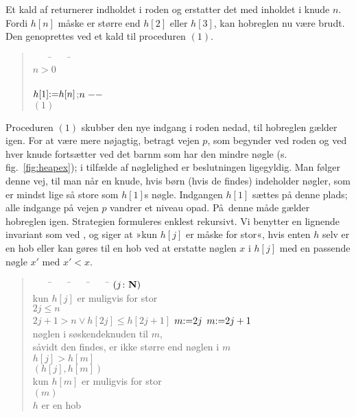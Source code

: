 Et kald af  returnerer indholdet i roden og erstatter det med inholdet i knude $n$.
Fordi $h[n]$ måske er større end $h[2]$ eller $h[3]$, kan hobreglen nu være brudt.
Den genoprettes ved et kald til proceduren $(1)$.

\begin{quote}
\begin{tabbing}
~~~~\=~~~~\=\kill
\Function {}\+\\
\Assert $n>0$\\
\\
$h[1]{\ensuremath{\mathbin{:=}}} h[n]$;\quad $n\mathrel{{-}{-}}$\\
$(1)$\\
\Return {}
\end{tabbing}
\end{quote}

Proceduren $(1)$ skubber den nye indgang i roden nedad, til hobreglen gælder igen.
For at være mere nøjagtig, betragt vejen $p$, som begynder ved roden og ved hver knude fortsætter ved det barnm som har den mindre nøgle (s. fig.~\ref{fig:heapex});
i tilfælde af nøglelighed er beslutningen ligegyldig. 
Man følger denne vej, til man når en knude, hvis børn (hvis de findes) indeholder nøgler, som er mindst lige så store som $h[1]$s nøgle.
Indgangen $h[1]$ sættes på denne plads; alle indgange på vejen $p$ vandrer et niveau opad.
På denne måde gælder hobreglen igen.
Strategien formuleres enklest rekursivt.
Vi benytter en lignende invariant som ved , og siger at »kun $h[j]$ er måske for stor«, hvis enten $h$ selv er en hob eller kan gøres til en hob ved at erstatte nøglen $x$ i  $h[j]$ med en passende nøgle $x'$ med  $x' < x$. 

\begin{quote}
\begin{tabbing}
~~~~\=~~~~\=~~~~\=~~~~\=\kill
\Procedure{}$(j{\colon} \mathbf N)$\+\\
\Assert kun $h[j]$ er muligvis for stor \\
\If $2j \leq n$ \Then\+\\
  \If $2j + 1 > n \vee h[2j] \le h[2j + 1]$ \Then $m {\mathbin{:=}} 2j$ \Else $m{\mathbin{:=}} 2j + 1$\\
  \Assert nøglen i søskendeknuden til  $m$,\+\+\\
  såvidt den findes, er ikke større end nøglen i $m$\-\-\\
  \If $h[j] > h[m]$ \Then\+\\
    $(h[j],h[m])$\\
    \Assert kun $h[m]$ er muligvis for stor\\
  $(m)$\-\-\\
\Assert $h$ er en hob
\end{tabbing}
\end{quote}


